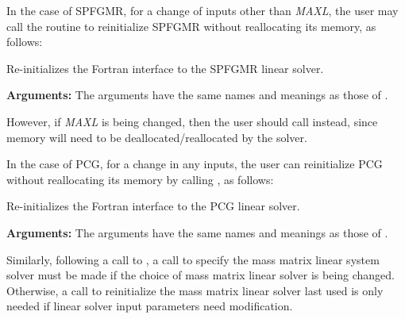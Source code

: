 \documentclass[letterpaper,10pt,english]{sphinxmanual}
\begin{document}
In the case of SPFGMR, for a change of inputs other than \emph{MAXL},
the user may call the routine {\hyperref[f_interface/Usage:f/_/FARKSPFGMRREINIT]{\emph{}}} to
reinitialize SPFGMR without reallocating its memory, as follows:

\begin{fulllineitems}
\label{f_interface/Usage:f/_/FARKSPFGMRREINIT}
Re-initializes the Fortran interface to the SPFGMR
linear solver.

\textbf{Arguments:}  The arguments have the same names and meanings as
those of {\hyperref[f_interface/Usage:f/_/FARKSPFGMR]{\emph{}}}.

\end{fulllineitems}


However, if \emph{MAXL} is being changed, then the user should call
{\hyperref[f_interface/Usage:f/_/FARKSPFGMR]{\emph{}}} instead, since memory will need to be
deallocated/reallocated by the solver.

In the case of PCG, for a change in any inputs, the user can
reinitialize PCG without reallocating its memory by calling
{\hyperref[f_interface/Usage:f/_/FARKPCGREINIT]{\emph{}}}, as follows:

\begin{fulllineitems}
\label{f_interface/Usage:f/_/FARKPCGREINIT}
Re-initializes the Fortran interface to the PCG
linear solver.

\textbf{Arguments:}  The arguments have the same names and meanings as
those of {\hyperref[f_interface/Usage:f/_/FARKPCG]{\emph{}}}.

\end{fulllineitems}


Similarly, following a call to {\hyperref[f_interface/Usage:f/_/FARKREINIT]{\emph{}}}, a call to
specify the mass matrix linear system solver must be made if the
choice of mass matrix linear solver is being changed.  Otherwise, a
call to reinitialize the mass matrix linear solver last used is only
needed if linear solver input parameters need modification.
\end{document}
